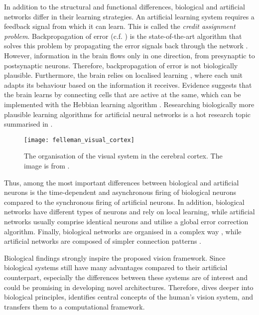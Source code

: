 In addition to the structural and functional differences, biological and artificial networks differ in their learning strategies.
An artificial learning system requires a feedback signal from which it can learn.
This is called the \emph{credit assignment problem}.
Backpropagation of error (c.f. ) is the state-of-the-art algorithm that solves this problem by propagating the error signals back through the network .
However, information in the brain flows only in one direction, from presynaptic to postsynaptic neurons.
Therefore, backpropagation of error is not biologically plausible.
Furthermore, the brain relies on localised learning , where each unit adapts its behaviour based on the information it receives.
Evidence suggests that the brain learns by connecting cells that are active at the same, which can be implemented with the Hebbian learning algorithm .
Researching biologically more plausible learning algorithms for artificial neural networks is a hot research topic summarised in .

\begin{figure}[h]
    \centering
    \texttt{[image: felleman\_visual\_cortex]}
    \caption[Organisation of the visual system in the cerebral cortex]{The organisation of the visual system in the cerebral cortex. The image is from .}
\end{figure}

Thus, among the most important differences between biological and artificial neurons is the time-dependent and asynchronous firing of biological neurons compared to the synchronous firing of artificial neurons. In addition, biological networks have different types of neurons and rely on local learning, while artificial networks usually comprise identical neurons and utilise a global error correction algorithm. Finally, biological networks are organised in a complex way , while artificial networks are composed of simpler connection patterns .

Biological findings strongly inspire the proposed vision framework.
Since biological systems still have many advantages compared to their artificial counterpart, especially the differences between these systems are of interest and could be promising in developing novel architectures.
Therefore,  dives deeper into biological principles, identifies central concepts of the human's vision system, and transfers them to a computational framework.

